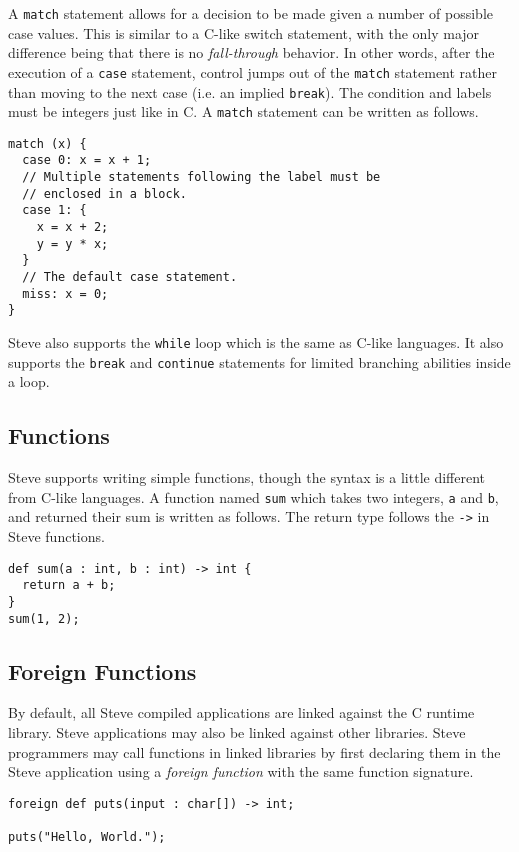 A \texttt{match} statement allows for a decision to be made given a number of 
possible case values. 
This is similar to a C-like switch statement, with the only
major difference being that there is no \textit{fall-through} behavior. In other
words, after the execution of a \texttt{case} statement, control jumps out of the 
\texttt{match} statement rather than moving to the next case (i.e. an implied 
\texttt{break}). 
The condition and labels must be integers just like in C. 
A \texttt{match} statement can be written as follows.

\begin{lstlisting}
match (x) {
  case 0: x = x + 1;
  // Multiple statements following the label must be
  // enclosed in a block.
  case 1: {
    x = x + 2;
    y = y * x;
  }
  // The default case statement.
  miss: x = 0;
}
\end{lstlisting}

Steve also supports the \texttt{while} loop which is the same as C-like languages. 
It also supports the \texttt{break} and \texttt{continue} statements for limited
branching abilities inside a loop. 

\subsection{Functions} \label{tut:function}

Steve supports writing simple functions, though the syntax is a little different
from C-like languages.
A function named \texttt{sum} which takes two
integers, \texttt{a} and \texttt{b}, and returned their sum is written as follows.
The return type follows the \texttt{->} in Steve functions.

\begin{lstlisting}
def sum(a : int, b : int) -> int {
  return a + b;
}
sum(1, 2);
\end{lstlisting}

\subsection{Foreign Functions} \label{tut:foreign}

By default, all Steve compiled applications are linked against the C runtime
library. Steve applications may also be linked against other libraries.
Steve programmers may call functions in linked libraries by first declaring
them in the Steve application using a \emph{foreign function} with the same
function signature.

\begin{lstlisting}
foreign def puts(input : char[]) -> int;

puts("Hello, World.");
\end{lstlisting}

